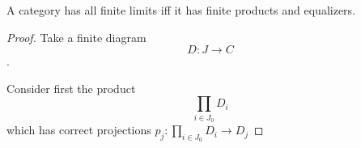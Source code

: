 \documentclass[../../notes.tex]{subfiles}
\begin{document}

A category has all finite limits iff it has finite products and equalizers.

\begin{proof}
  Take a finite diagram
  $$ D : {J} \rightarrow C $$.

  Consider first the product
  $$ \prod_{i \in J_0} D_i $$
  which has correct projections $ p_j : \prod_{i \in J_0} D_i \rightarrow D_j  $
\end{proof}

\end{document}

